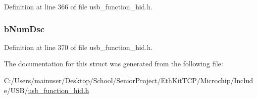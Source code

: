 Definition at line 366 of file usb\+\_\+function\+\_\+hid.\+h.

\hypertarget{struct___u_s_b___h_i_d___d_s_c_a6303e823747b3ff62fb36ff93ecfba33}{}
\subsubsection[{b\+Num\+Dsc}]{ b\+Num\+Dsc}\label{struct___u_s_b___h_i_d___d_s_c_a6303e823747b3ff62fb36ff93ecfba33}


Definition at line 370 of file usb\+\_\+function\+\_\+hid.\+h.



The documentation for this struct was generated from the following file\+:\begin{DoxyCompactItemize}
\item 
C\+:/\+Users/mainuser/\+Desktop/\+School/\+Senior\+Project/\+Eth\+Kit\+T\+C\+P/\+Microchip/\+Include/\+U\+S\+B/\hyperlink{usb__function__hid_8h}{usb\+\_\+function\+\_\+hid.\+h}\end{DoxyCompactItemize}
